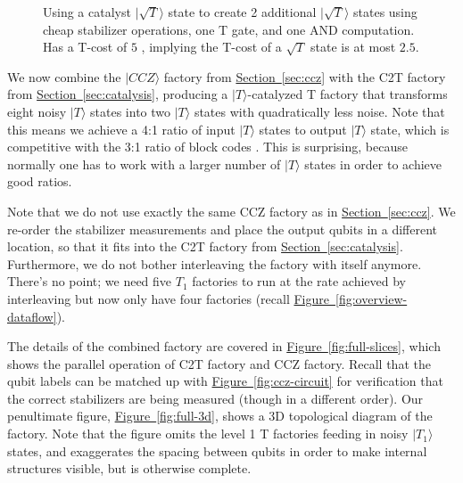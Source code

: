 \documentclass[twocolumn,accepted=2019-03-30]{quantumarticle}
\renewcommand{\sec}[1]{\hyperref[sec:#1]{Section~\ref*{sec:#1}}}
\newcommand{\fig}[1]{\hyperref[fig:#1]{Figure~\ref*{fig:#1}}}
\begin{document}
\begin{figure}
    \label{fig:catalysis-circuit-sqrt-t}
    \centering
    \caption{
        Using a catalyst $|\sqrt{T}\rangle$ state to create 2 additional $|\sqrt{T}\rangle$ states using cheap stabilizer operations, one T gate, and one AND computation.
        Has a T-cost of $5$ \cite{jones2013, gidney2018}, implying the T-cost of a $\sqrt{T}$ state is at most $2.5$.
    }
\end{figure}

We now combine the $|CCZ\rangle$ factory from \sec{ccz} with the C2T factory from \sec{catalysis}, producing a $|T\rangle$-catalyzed T factory that transforms eight noisy $|T\rangle$ states into two $|T\rangle$ states with quadratically less noise.
Note that this means we achieve a 4:1 ratio of input $|T\rangle$ states to output $|T\rangle$ state, which is competitive with the 3:1 ratio of block codes \cite{bravyi2012}.
This is surprising, because normally one has to work with a larger number of $|T\rangle$ states in order to achieve good ratios.

Note that we do not use exactly the same CCZ factory as in \sec{ccz}.
We re-order the stabilizer measurements and place the output qubits in a different location, so that it fits into the C2T factory from \sec{catalysis}.
Furthermore, we do not bother interleaving the factory with itself anymore.
There's no point; we need five $T_1$ factories to run at the rate achieved by interleaving but now only have four factories (recall \fig{overview-dataflow}).

The details of the combined factory are covered in \fig{full-slices}, which shows the parallel operation of C2T factory and CCZ factory.
Recall that the qubit labels can be matched up with \fig{ccz-circuit} for verification that the correct stabilizers are being measured (though in a different order).
Our penultimate figure, \fig{full-3d}, shows a 3D topological diagram of the factory.
Note that the figure omits the level 1 T factories feeding in noisy $|T_1\rangle$ states, and exaggerates the spacing between qubits in order to make internal structures visible, but is otherwise complete.
\end{document}
